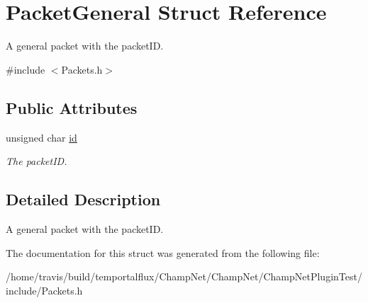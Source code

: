 \hypertarget{struct_packet_general}{\section{Packet\-General Struct Reference}
\label{struct_packet_general}
}


A general packet with the packet\-I\-D.  




{\ttfamily \#include $<$Packets.\-h$>$}

\subsection*{Public Attributes}
\begin{DoxyCompactItemize}
\item 
\hypertarget{struct_packet_general_aac5930add4956e3e3bab8c9a1d170ad8}{unsigned char \hyperlink{struct_packet_general_aac5930add4956e3e3bab8c9a1d170ad8}{id}}\label{struct_packet_general_aac5930add4956e3e3bab8c9a1d170ad8}

\begin{DoxyCompactList}\small\item\em The packet\-I\-D. \end{DoxyCompactList}\end{DoxyCompactItemize}


\subsection{Detailed Description}
A general packet with the packet\-I\-D. 

The documentation for this struct was generated from the following file\-:\begin{DoxyCompactItemize}
\item 
/home/travis/build/temportalflux/\-Champ\-Net/\-Champ\-Net/\-Champ\-Net\-Plugin\-Test/include/Packets.\-h\end{DoxyCompactItemize}
